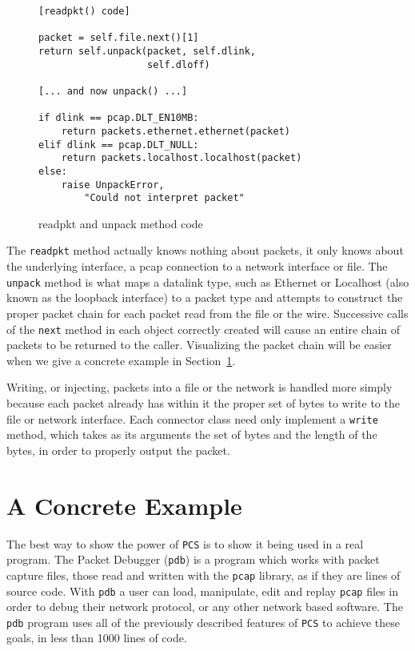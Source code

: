 \documentclass[pdftex]{article}
\begin{document}
\begin{figure}
  \centering
  \begin{lstlisting}
[readpkt() code]

packet = self.file.next()[1]
return self.unpack(packet, self.dlink, 
                   self.dloff)

[... and now unpack() ...]

if dlink == pcap.DLT_EN10MB:
    return packets.ethernet.ethernet(packet)
elif dlink == pcap.DLT_NULL:
    return packets.localhost.localhost(packet)
else:
    raise UnpackError, 
        "Could not interpret packet"
      \end{lstlisting}
      \caption{readpkt and unpack method code}
      \label{fig:readpkt-and-unpack-code}
\end{figure}

The \verb|readpkt| method actually knows nothing about packets, it
only knows about the underlying interface, a pcap connection to a
network interface or file.  The \verb|unpack| method is what maps a
datalink type, such as Ethernet or Localhost (also known as the
loopback interface) to a packet type and attempts to construct the
proper packet chain for each packet read from the file or the wire.
Successive calls of the \verb|next| method in each object correctly
created will cause an entire chain of packets to be returned to the
caller.  Visualizing the packet chain will be easier when we give a
concrete example in Section~\ref{sec:a-concrete-example}.

Writing, or injecting, packets into a file or the network is handled
more simply because each packet already has within it the proper set
of bytes to write to the file or network interface.  Each connector
class need only implement a \verb|write| method, which takes as its
arguments the set of bytes and the length of the bytes, in order to
properly output the packet.

\section{A Concrete Example}
\label{sec:a-concrete-example}

The best way to show the power of \verb|PCS| is to show it being
used in a real program.  The Packet Debugger (\verb|pdb|) is a
program which works with packet capture files, those read and written
with the \verb|pcap| library, as if they are lines of source code.
With \verb|pdb| a user can load, manipulate, edit and replay
\verb|pcap| files in order to debug their network protocol, or any
other network based software.  The \verb|pdb| program uses all of
the previously described features of \verb|PCS| to achieve these
goals, in less than 1000 lines of code.
\end{document}
